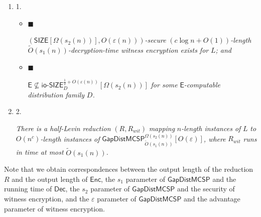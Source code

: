 \documentclass[10pt,a4paper]{article}
\begin{document}
\begin{enumerate}


\item[] 
1. 


\begin{itemize}


\item[] 
$\blacksquare$ 


$\left({\mathsf{SIZE}}[\Omega(s_{2}(n))],O(\varepsilon(n))\right)$\emph{-secure }$(c\log n+O(1))$\emph{-length }$\widetilde{O}(s_{1}(n))$\emph{-decryption-time witness encryption exists for }$L$\emph{; and}\par





\item[] 
$\blacksquare$ 


${\mathsf{E}}\nsubseteq{\mathsf{io\text{-}}}{\mathsf{SIZE}}_{D}^{\frac{1}{2}+O(\varepsilon(n))}[\Omega(s_{2}(n))]$\emph{ for some }${\mathsf{E}}$\emph{-computable distribution family }$D$\emph{.}\par





\end{itemize}





\item[] 
2. 


\emph{There is a half-Levin reduction }$(R,R_{wit})$\emph{ mapping }$n$\emph{-length instances of }$L$\emph{ to }$O(n^{c})$\emph{-length instances of
}${\mathsf{GapDistMCSP}}_{\widetilde{O}(s_{1}(n))}^{\Omega(s_{2}(n))}[O(\varepsilon)]$\emph{, where }$R_{wit}$\emph{ runs in time at most }$\widetilde{O}(s_{1}(n))$\emph{.}\par





\end{enumerate}






Note that we obtain correspondences between the output length of the reduction $R$ and the output length of ${\mathsf{Enc}}$, the $s_{1}$ parameter of ${\mathsf{GapDistMCSP}}$ and the running time of ${\mathsf{Dec}}$, the $s_{2}$ parameter of ${\mathsf{GapDistMCSP}}$ and the security of witness encryption, and the $\varepsilon$ parameter of ${\mathsf{GapDistMCSP}}$ and the advantage parameter of witness encryption.\par
\end{document}
